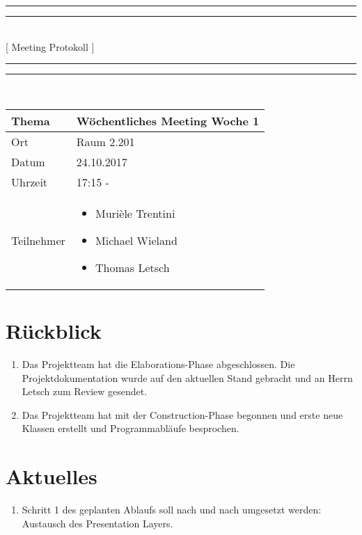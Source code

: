 \documentclass[11pt, a4paper,oneside]{scrartcl}
\begin{document}
\centering
\rule{\textwidth}{1.6pt}\vspace*{-\baselineskip}\vspace*{2pt} %
\rule{\textwidth}{0.4pt}\\[\baselineskip] %
{\LARGE [ Meeting Protokoll ]}\\[0.2\baselineskip] %
\rule{\textwidth}{0.4pt}\vspace*{-\baselineskip}\vspace{3.2pt} %
\rule{\textwidth}{1.6pt}\\[2\baselineskip] %

\begin{tabu} to \linewidth {l X }
	\toprule
	\textbf{Thema} & \textbf{Wöchentliches Meeting Woche 1} \\
	\midrule
	Ort & Raum 2.201 \\
	Datum & 24.10.2017  \\
	Uhrzeit &  17:15 -  \\
	Teilnehmer & 
	\begin{minipage}[t]{\textwidth}
	  	\begin{itemize}
			\item Murièle Trentini
			\item Michael Wieland
			\item Thomas Letsch
	  	\end{itemize}
	\end{minipage}
	\\
	\bottomrule
\end{tabu}


\section{Rückblick}
\begin{enumerate}
	\item Das Projektteam hat die Elaborations-Phase abgeschlossen. Die Projektdokumentation wurde auf den aktuellen Stand gebracht und an Herrn Letsch zum Review gesendet.
	\item Das Projektteam hat mit der Construction-Phase begonnen und erste neue Klassen erstellt und Programmabläufe besprochen.
\end{enumerate}

\section{Aktuelles}
\begin{enumerate}
	\item Schritt 1 des geplanten Ablaufs soll nach und nach umgesetzt werden: Austausch des Presentation Layers.
\end{enumerate}
\end{document}
